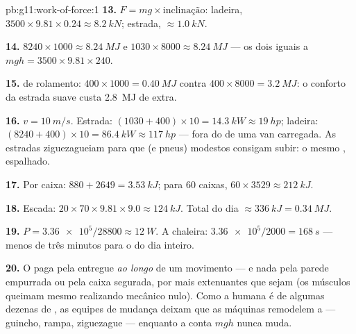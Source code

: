 \begin{solution}{pb:g11:work-of-force:1}
\textbf{13.} $F = mg \times \text{inclinação}$: ladeira,
$3500 \times 9.81 \times 0.24 \approx \qty{8.2}{kN}$; estrada,
$\approx \qty{1.0}{kN}$.

\textbf{14.} $8240 \times 1000 \approx \qty{8.24}{MJ}$ e
$1030 \times 8000 \approx \qty{8.24}{MJ}$ --- os dois iguais a
$mgh = 3500 \times 9.81 \times 240$.

\textbf{15.}  de rolamento:
$400 \times 1000 = \qty{0.40}{MJ}$ contra
$400 \times 8000 = \qty{3.2}{MJ}$: o conforto da estrada suave custa
\qty{2.8}{MJ} de  extra.

\textbf{16.} $v = \qty{10}{m/s}$. Estrada:
$(1030 + 400) \times 10 = \qty{14.3}{kW} \approx \qty{19}{hp}$; ladeira:
$(8240 + 400) \times 10 = \qty{86.4}{kW} \approx \qty{117}{hp}$ --- fora
do  de uma van carregada. As estradas ziguezagueiam para que
 (e pneus) modestos consigam subir: o mesmo , espalhado.

\textbf{17.} Por caixa: $880 + 2649 = \qty{3.53}{kJ}$; para $60$ caixas,
$60 \times 3529 \approx \qty{212}{kJ}$.

\textbf{18.} Escada: $20 \times 70 \times 9.81 \times 9.0 \approx
\qty{124}{kJ}$. Total do dia $\approx \qty{336}{kJ} = \qty{0.34}{MJ}$.

\textbf{19.} $P = \num{3.36e5}/28800 \approx \qty{12}{W}$. A chaleira:
$\num{3.36e5}/2000 = \qty{168}{s}$ --- menos de três minutos para o
 do dia inteiro.

\textbf{20.} O  paga pela  entregue \emph{ao longo} de um
movimento --- e nada pela parede empurrada ou pela caixa segurada, por
mais extenuantes que sejam (os músculos queimam  mesmo
realizando  mecânico nulo). Como a  humana é de algumas
dezenas de , as equipes de mudança deixam que as máquinas remodelem
a  --- guincho, rampa, ziguezague --- enquanto a conta $mgh$ nunca
muda.
\end{solution}
